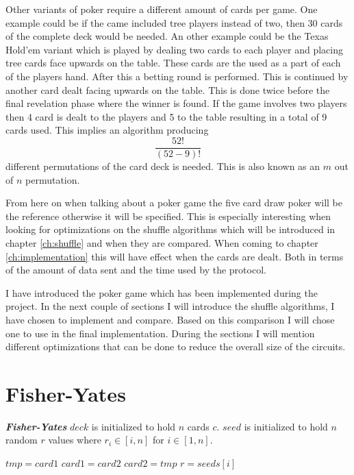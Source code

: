 \documentclass[twoside,11pt,openright]{report}
\begin{document}
Other variants of poker require a different amount of cards per game. One example could be if the came included tree players instead of two, then 30 cards of the complete deck would be needed. An other example could be the Texas Hold'em variant which is played by dealing two cards to each player and placing tree cards face upwards on the table. These cards are the used as a part of each of the players hand. After this a betting round is performed. This is continued by another card dealt facing upwards on the table. This is done twice before the final revelation phase where the winner is found. If the game involves two players then 4 card is dealt to the players and 5 to the table resulting in a total of 9 cards used. This implies an algorithm producing $$\frac{52!}{(52-9)!}$$ different permutations of the card deck is needed. This is also known as an $m$ out of $n$ permutation.

From here on when talking about a poker game the five card draw poker will be the reference otherwise it will be specified. This is especially interesting when looking for optimizations on the shuffle algorithms which will be introduced in chapter \ref{ch:shuffle} and when they are compared. When coming to chapter \ref{ch:implementation} this will have effect when the cards are dealt. Both in terms of the amount of data sent and the time used by the protocol.

\bigskip

I have introduced the poker game which has been implemented during the project. In the next couple of sections I will introduce the shuffle algorithms, I have chosen to implement and compare. Based on this comparison I will chose one to use in the final implementation. During the sections I will mention different optimizations that can be done to reduce the overall size of the circuits.


\section{Fisher-Yates}
\label{sec:fisher-yates}
\begin{algorithm}
\caption{\textbf{\textit{Fisher-Yates}} \newline
    $deck$ is initialized to hold $n$ cards $c$. \newline
    $seed$ is initialized to hold $n$ random $r$ values where $r_i\in[i,n]$ for $i\in [1,n]$.
}
\label{alg:fisher_yates}

\begin{algorithmic}[1]
\State $tmp = card1$
\State $card1 = card2$
\State $card2 = tmp$
\EndFunction
\State
{}
\State $r = seeds[i]$
\State {}
\EndFor
\EndFunction
\end{algorithmic}
\end{algorithm}
\end{document}
